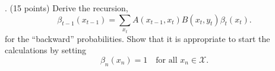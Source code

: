 \documentclass{article}
\begin{document}
\bigskip

. (15 points) Derive the recursion, 
\[
\beta_{t-1}(x_{t-1}) = \sum_{x_t} A(x_{t-1}, x_t) B(x_t, y_t) \beta_t(x_t).
\]
for the “backward” probabilities. Show that it is appropriate to start the calculations by setting
\[
\beta_n(x_n) = 1 \quad \text{for all } x_n \in \mathcal{X}.
\]


\textcolor{blue}{}

\bigskip
\end{document}

